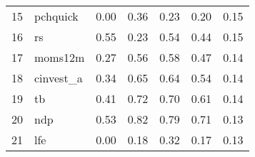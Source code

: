 \documentclass[12pt]{article}
\begin{document}
\begin{footnotesize}
\begin{longtable}{rl|c|c|c|c|c}
15  & pchquick         & 0.00                                                                                      & 0.36                                                                                        & 0.23                                                                                         & 0.20 & 0.15               \\
16  & rs               & 0.55                                                                                      & 0.23                                                                                        & 0.54                                                                                         & 0.44 & 0.15               \\
17  & moms12m          & 0.27                                                                                      & 0.56                                                                                        & 0.58                                                                                         & 0.47 & 0.14               \\
18  & cinvest\_a       & 0.34                                                                                      & 0.65                                                                                        & 0.64                                                                                         & 0.54 & 0.14               \\
19  & tb               & 0.41                                                                                      & 0.72                                                                                        & 0.70                                                                                         & 0.61 & 0.14               \\
20  & ndp              & 0.53                                                                                      & 0.82                                                                                        & 0.79                                                                                         & 0.71 & 0.13               \\
21  & lfe              & 0.00                                                                                      & 0.18                                                                                        & 0.32                                                                                         & 0.17 & 0.13               \\

\end{longtable}
\end{footnotesize}
\end{document}
